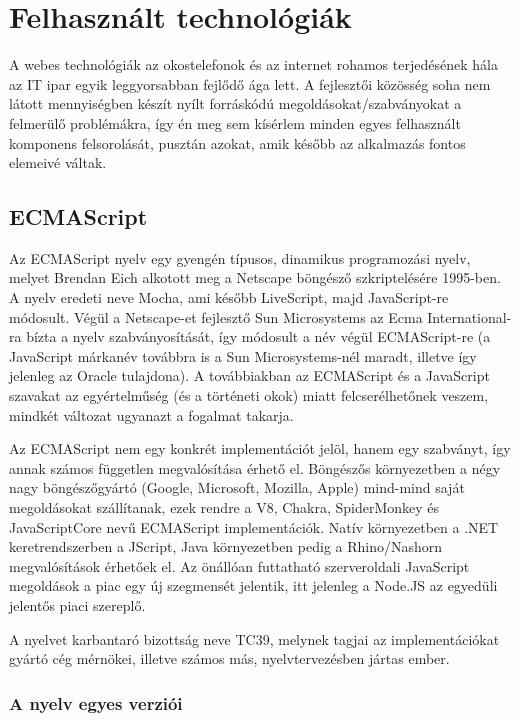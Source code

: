 \chapter{Felhasznált technológiák}

A webes technológiák az okostelefonok és az internet rohamos terjedésének hála
az IT ipar egyik leggyorsabban fejlődő ága lett.  A fejlesztői közösség soha nem
látott mennyiségben készít nyílt forráskódú megoldásokat/szabványokat a
felmerülő problémákra, így én meg sem kísérlem minden egyes felhasznált
komponens felsorolását, pusztán azokat, amik később az alkalmazás fontos
elemeivé váltak.

\section{ECMAScript}

Az ECMAScript nyelv egy gyengén típusos, dinamikus programozási nyelv, melyet
Brendan Eich alkotott meg a Netscape böngésző szkriptelésére 1995-ben.  A nyelv
eredeti neve Mocha, ami később LiveScript, majd JavaScript-re módosult.  Végül a
Netscape-et fejlesztő Sun Microsystems az Ecma International-ra bízta a nyelv
szabványosítását, így módosult a név végül ECMAScript-re (a JavaScript márkanév
továbbra is a Sun Microsystems-nél maradt, illetve így jelenleg az Oracle
tulajdona). A továbbiakban az ECMAScript és a JavaScript szavakat az
egyértelműség (és a történeti okok) miatt felcserélhetőnek veszem, mindkét
változat ugyanazt a fogalmat takarja.

Az ECMAScript nem egy konkrét implementációt jelöl, hanem egy szabványt, így
annak számos független megvalósítása érhető el.  Böngészős környezetben a négy
nagy böngészőgyártó (Google, Microsoft, Mozilla, Apple) mind-mind saját
megoldásokat szállítanak, ezek rendre a V8, Chakra, SpiderMonkey és
JavaScriptCore nevű ECMAScript implementációk.  Natív környezetben a .NET
keretrendszerben a JScript, Java környezetben pedig a Rhino/Nashorn
megvalósítások érhetőek el.  Az önállóan futtatható szerveroldali JavaScript
megoldások a piac egy új szegmensét jelentik, itt jelenleg a Node.JS az egyedüli
jelentős piaci szereplő.

A nyelvet karbantaró bizottság neve TC39, melynek tagjai az implementációkat
gyártó cég mérnökei, illetve számos más, nyelvtervezésben jártas ember.

\subsection{A nyelv egyes verziói}

